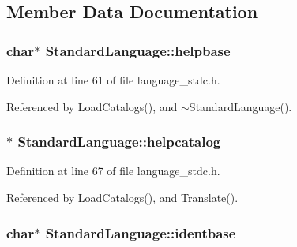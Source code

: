 \subsection{Member Data Documentation}
\subsubsection[{\texorpdfstring{helpbase}{helpbase}}]{\setlength{\rightskip}{0pt plus 5cm}char$\ast$ Standard\+Language\+::helpbase\hspace{0.3cm}{\ttfamily [private]}}\hypertarget{classStandardLanguage_a59e4ecff11a3a1f03aeff6af81004c2a}{}\label{classStandardLanguage_a59e4ecff11a3a1f03aeff6af81004c2a}


Definition at line 61 of file language\+\_\+stdc.\+h.



Referenced by Load\+Catalogs(), and $\sim$\+Standard\+Language().

\subsubsection[{\texorpdfstring{helpcatalog}{helpcatalog}}]{$\ast$ Standard\+Language\+::helpcatalog\hspace{0.3cm}{\ttfamily [private]}}\hypertarget{classStandardLanguage_a75febfaeb78c26265b46b77d6fc5869c}{}\label{classStandardLanguage_a75febfaeb78c26265b46b77d6fc5869c}


Definition at line 67 of file language\+\_\+stdc.\+h.



Referenced by Load\+Catalogs(), and Translate().

\subsubsection[{\texorpdfstring{identbase}{identbase}}]{\setlength{\rightskip}{0pt plus 5cm}char$\ast$ Standard\+Language\+::identbase\hspace{0.3cm}{\ttfamily [private]}}\hypertarget{classStandardLanguage_af3bade0473bfa891d45f7938043df84f}{}\label{classStandardLanguage_af3bade0473bfa891d45f7938043df84f}


